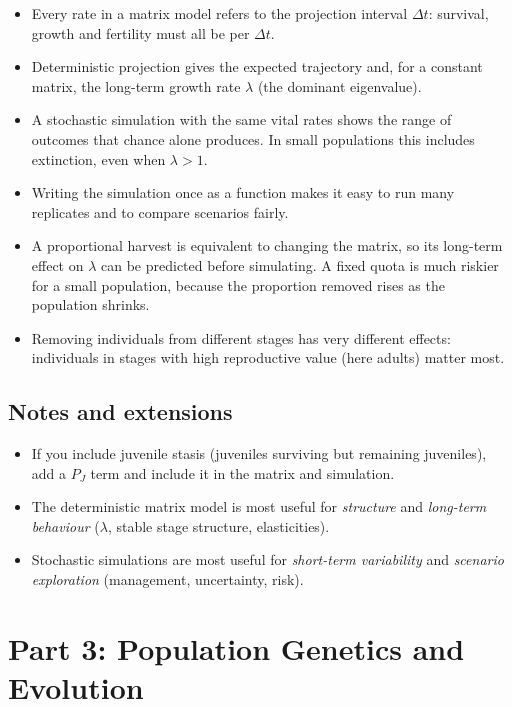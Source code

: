 \documentclass[
  a4paper]{book}
\providecommand{\tightlist}{%
  \setlength{\itemsep}{0pt}\setlength{\parskip}{0pt}}
\begin{document}
\begin{itemize}
\tightlist
\item
  Every rate in a matrix model refers to the projection interval \(\Delta t\): survival, growth and fertility must all be per \(\Delta t\).
\item
  Deterministic projection gives the expected trajectory and, for a constant matrix, the long-term growth rate \(\lambda\) (the dominant eigenvalue).
\item
  A stochastic simulation with the same vital rates shows the range of outcomes that chance alone produces. In small populations this includes extinction, even when \(\lambda > 1\).
\item
  Writing the simulation once as a function makes it easy to run many replicates and to compare scenarios fairly.
\item
  A proportional harvest is equivalent to changing the matrix, so its long-term effect on \(\lambda\) can be predicted before simulating. A fixed quota is much riskier for a small population, because the proportion removed rises as the population shrinks.
\item
  Removing individuals from different stages has very different effects: individuals in stages with high reproductive value (here adults) matter most.
\end{itemize}

\section{Notes and extensions}\label{notes-and-extensions}

\begin{itemize}
\tightlist
\item
  If you include juvenile stasis (juveniles surviving but remaining juveniles), add a \(P_J\) term and include it in the matrix and simulation.
\item
  The deterministic matrix model is most useful for \emph{structure} and \emph{long-term behaviour} (\(\lambda\), stable stage structure, elasticities).
\item
  Stochastic simulations are most useful for \emph{short-term variability} and \emph{scenario exploration} (management, uncertainty, risk).
\end{itemize}

\chapter*{Part 3: Population Genetics and Evolution}\label{part-3}
\end{document}
